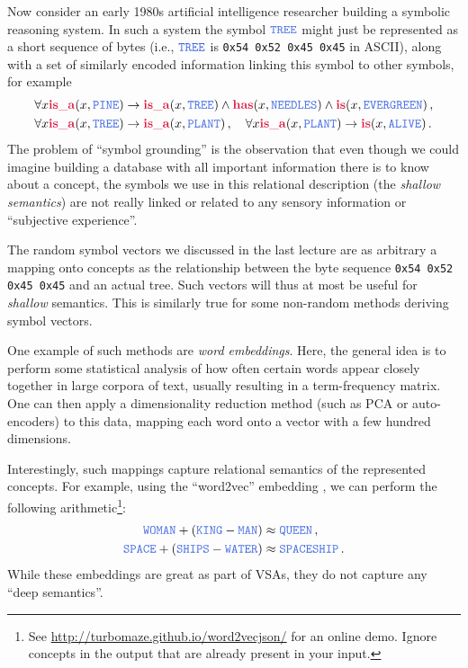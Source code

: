 \documentclass[10pt,letterpaper,oneside]{article}
\newcommand{\Pred}[1]{\ensuremath{\mathbf{\textcolor{Crimson}{#1}}}}
\newcommand{\Obj}[1]{\ensuremath{\mathtt{\textcolor{RoyalBlue}{#1}}}}
\begin{document}
Now consider an early 1980s artificial intelligence researcher building a symbolic reasoning system. In such a system the symbol {\Obj{TREE}} might just be represented as a short sequence of bytes (i.e., \Obj{TREE} is \texttt{0x54 0x52 0x45 0x45} in ASCII), along with a set of similarly encoded information linking this symbol to other symbols, for example
\begin{align*}
	\forall x \Pred{is\_a}(x, \Obj{PINE}) &\rightarrow \Pred{is\_a}(x, \Obj{TREE}) \wedge \Pred{has}(x, \Obj{NEEDLES}) \wedge \Pred{is}(x, \Obj{EVERGREEN}) \,, \\
	\forall x \Pred{is\_a}(x, \Obj{TREE}) &\rightarrow \Pred{is\_a}(x, \Obj{PLANT}) \,, \quad \forall x \Pred{is\_a}(x, \Obj{PLANT}) \rightarrow \Pred{is}(x, \Obj{ALIVE}) \,.
\end{align*}
The problem of \enquote{symbol grounding} is the observation that even though we could imagine building a database with all important information there is to know about a concept, the symbols we use in this relational description (the \emph{shallow semantics}) are not really linked or related to any sensory information or \enquote{subjective experience}.


The random symbol vectors we discussed in the last lecture are as arbitrary a mapping onto concepts as the relationship between the byte sequence \texttt{0x54 0x52 0x45 0x45} and an actual tree. Such vectors will thus at most be useful for \emph{shallow} semantics. This is similarly true for some non-random methods deriving symbol vectors.

One example of such methods are \emph{word embeddings}. Here, the general idea is to perform some statistical analysis of how often certain words appear closely together in large corpora of text, usually resulting in a term-frequency matrix. One can then apply a dimensionality reduction method (such as PCA or auto-encoders) to this data, mapping each word onto a vector with a few hundred dimensions.

Interestingly, such mappings capture relational semantics of the represented concepts. For example, using the \enquote{word2vec} embedding \cite{mikolov2013efficient}, we can perform the following arithmetic\footnote{See \url{http://turbomaze.github.io/word2vecjson/} for an online demo. Ignore concepts in the output that are already present in your input.}:
\begin{align*}
	\Obj{WOMAN} + (\Obj{KING} - \Obj{MAN}) &\approx \Obj{QUEEN} \,,\\
	\Obj{SPACE} + (\Obj{SHIPS} - \Obj{WATER}) &\approx \Obj{SPACESHIP} \,.
\end{align*}
While these embeddings are great as part of VSAs, they do not capture any \enquote{deep semantics}.
\end{document}
